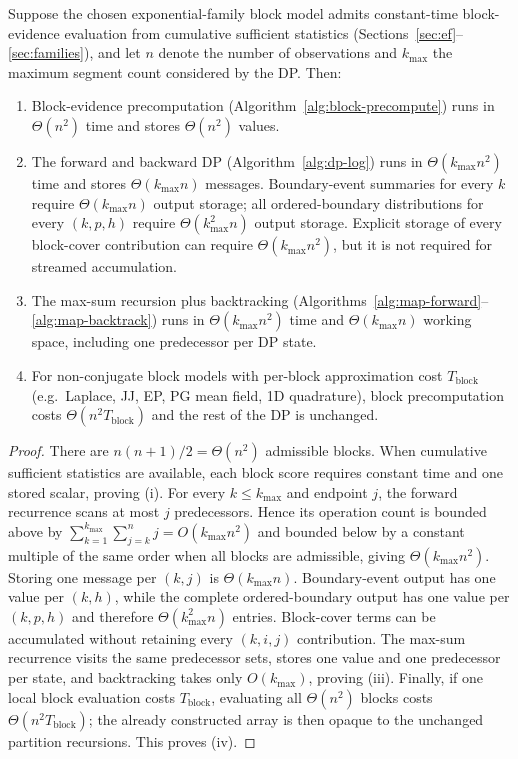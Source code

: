 \begin{proposition}
\label{prop:bb-complexity}
Suppose the chosen exponential-family block model admits constant-time block-evidence evaluation
from cumulative sufficient statistics (Sections~\ref{sec:ef}--\ref{sec:families}), and let
$n$ denote the number of observations and $k_{\max}$ the maximum segment count considered by the
DP. Then:
\begin{enumerate}
\item Block-evidence precomputation (Algorithm~\ref{alg:block-precompute}) runs in $\Theta(n^2)$ time and stores $\Theta(n^2)$ values.
\item The forward and backward DP (Algorithm~\ref{alg:dp-log}) runs in $\Theta(k_{\max}n^2)$ time and stores $\Theta(k_{\max}n)$ messages. Boundary-event summaries for every $k$ require $\Theta(k_{\max}n)$ output storage; all ordered-boundary distributions for every $(k,p,h)$ require $\Theta(k_{\max}^2n)$ output storage. Explicit storage of every block-cover contribution can require $\Theta(k_{\max}n^2)$, but it is not required for streamed accumulation.
\item The max-sum recursion plus backtracking (Algorithms~\ref{alg:map-forward}--\ref{alg:map-backtrack}) runs in $\Theta(k_{\max}n^2)$ time and $\Theta(k_{\max}n)$ working space, including one predecessor per DP state.
\item For non-conjugate block models with per-block approximation cost $T_{\mathrm{block}}$ (e.g.\ Laplace, JJ, EP, PG mean field, 1D quadrature), block precomputation costs $\Theta(n^2 T_{\mathrm{block}})$ and the rest of the DP is unchanged.
\end{enumerate}
\end{proposition}

\begin{proof}
There are $n(n+1)/2=\Theta(n^2)$ admissible blocks. When cumulative sufficient statistics are available, each block score requires constant time and one stored scalar, proving (i). For every
$k\le k_{\max}$ and endpoint $j$, the forward recurrence scans at most $j$ predecessors. Hence
its operation count is bounded above by $\sum_{k=1}^{k_{\max}}\sum_{j=k}^n j=
O(k_{\max}n^2)$ and bounded below by a constant multiple of the same order when all blocks are
admissible, giving $\Theta(k_{\max}n^2)$. Storing one message per $(k,j)$ is
$\Theta(k_{\max}n)$. Boundary-event output has one value per $(k,h)$, while the complete
ordered-boundary output has one value per $(k,p,h)$ and therefore $\Theta(k_{\max}^2n)$ entries.
Block-cover terms can be accumulated without retaining every $(k,i,j)$ contribution. The max-sum
recurrence visits the same predecessor sets, stores one value and one predecessor per state, and
backtracking takes only $O(k_{\max})$, proving (iii). Finally, if one local block evaluation costs
$T_{\mathrm{block}}$, evaluating all $\Theta(n^2)$ blocks costs
$\Theta(n^2T_{\mathrm{block}})$; the already constructed array is then opaque to the unchanged
partition recursions. This proves (iv).
\end{proof}


